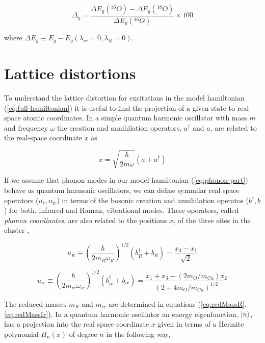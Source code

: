 \begin{equation}
  \label{eq:isot-shift-def-grd}
  \Delta_g = \frac{\Delta E_g(^{16}O)- \Delta E_g(^{18}O)}{\Delta E_g(^{16}O)} \times 100
\end{equation}

\noindent where $\Delta E_g \equiv E_g - E_g(\lambda_{ir}=0, \lambda_R=0)$.

\section{Lattice distortions}
\label{sec:lattice-distortions}

To understand the lattice distortion for excitations in the model hamiltonian (\ref{eq:full-hamiltonian}) it is useful to find the projection of a given state to real space atomic coordinates. 
In a simple quantum harmonic oscillator with mass $m$ and frequency $\omega$ the creation and annihilation operators, $a^\dagger$ and $a$, are related to the real-space coordinate $x$ as

\begin{equation}
  \label{eq:harmOscRel}
  x=\sqrt{\frac{\hbar}{2m\omega}}\left(a+a^\dagger\right)
\end{equation}

If we assume that phonon modes in our model hamiltonian (\ref{eq:phonon-part}) behave as quantum harmonic oscillators, we can define symmilar real space operators ($u_r,u_{ir}$) in terms of the bosonic creation and annihilation operatos ($b^\dagger,b$) for both, infrared and Raman, vibrational modes. 
These operators, called \textit{phonon coordinates}, are also related to the positions $x_i$ of the three sites in the cluster \cite{MustredeLeon1992},

\begin{equation}
  \label{eq:uR}
  u_R \equiv \left(\frac{\hbar}{2 m_R \omega_R}\right)^{1/2}(b_R^\dagger + b_R) = \frac{x_3 - x_1}{\sqrt{2}}
\end{equation}

\begin{equation}
  \label{eq:uir}
  u_{ir} \equiv \left(\frac{\hbar}{2 m_{ir} \omega_{ir}}\right)^{1/2}(b^\dagger_{ir}+b_{ir}) = \frac{ x_1 + x_3 - ( 2 m_O/m_{Cu})x_2}{(2 + 4 m_O/m_{Cu})^{1/2}}
\end{equation}

The reduced masses $m_R$ and $m_{ir}$ are determined in equations (\ref{eq:redMassR}, \ref{eq:redMassIr}).
In a quantum harmonic oscillator an energy eigenfunction, $\left | n \right\rangle$, has a projection into the real space coordinate $x$ given in terms of a Hermite polynomial $H_n(x)$ of degree $n$ in the following way,

